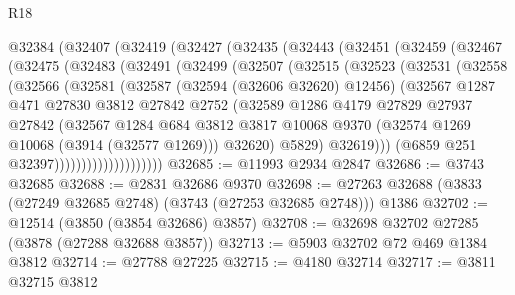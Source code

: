 \begin{lexlean}{R18}
\begin{coremodule}
    @32384
      (@32407
        (@32419
          (@32427
            (@32435
              (@32443
                (@32451
                  (@32459
                    (@32467
                      (@32475
                        (@32483
                          (@32491
                            (@32499
                              (@32507
                                (@32515
                                  (@32523
                                    (@32531
                                      (@32558
                                        (@32566
                                          (@32581
                                            (@32587
                                              (@32594 (@32606 @32620) @12456)
                                              (@32567
                                                @1287
                                                @471
                                                @27830
                                                @3812
                                                @27842
                                                @2752
                                                (@32589
                                                  @1286
                                                  @4179
                                                  @27829
                                                  @27937
                                                  @27842
                                                  (@32567
                                                    @1284
                                                    @684
                                                    @3812
                                                    @3817
                                                    @10068
                                                    @9370
                                                    (@32574 @1269 @10068 (@3914 (@32577 @1269)))
                                                    @32620)
                                                  @5829)
                                                @32619)))
                                          (@6859 @251 @32397))))))))))))))))))))
@32685 := @11993 @2934 @2847
@32686 := @3743 @32685
@32688 := @2831 @32686 @9370
@32698 := @27263 @32688 (@3833 (@27249 @32685 @2748) (@3743 (@27253 @32685 @2748))) @1386
@32702 := @12514 (@3850 (@3854 @32686) @3857)
@32708 := @32698 @32702 @27285 (@3878 (@27288 @32688 @3857))
@32713 := @5903 @32702 @72 @469 @1384 @3812
@32714 := @27788 @27225
@32715 := @4180 @32714
@32717 := @3811 @32715 @3812

\end{coremodule}
\end{lexlean}
